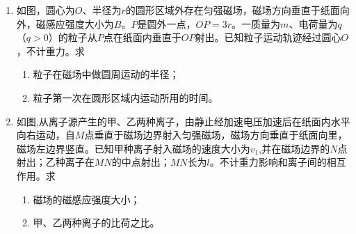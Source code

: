 \begin{enumerate}[leftmargin=0em]
\newpage
\item
{}
如图，圆心为$ O $、半径为$ r $的圆形区域外存在匀强磁场，磁场方向垂直于纸面向外，磁感应强度大小为$ B $。$ P $是圆外一点，$ OP=3r $。一质量为$ m $、电荷量为$ q $（$ q>0 $）的粒子从$ P $点在纸面内垂直于$ OP $射出。已知粒子运动轨迹经过圆心$ O $，不计重力。求
\begin{enumerate}
\renewcommand{\labelenumi}{\arabic{enumi}.}
\item
粒子在磁场中做圆周运动的半径；
\item 
粒子第一次在圆形区域内运动所用的时间。



\end{enumerate}
\begin{figure}[h!]
\flushright

\end{figure}






\newpage
\item
{}
如图,从离子源产生的甲、乙两种离子，由静止经加速电压加速后在纸面内水平向右运动，自$ M $点垂直于磁场边界射入匀强磁场，磁场方向垂直于纸面向里，磁场左边界竖直。已知甲种离子射入磁场的速度大小为$ v_{1} $,并在磁场边界的$ N $点射出；乙种离子在$ MN $的中点射出；$ MN $长为$ l $。不计重力影响和离子间的相互作用。求
\begin{enumerate}
\renewcommand{\labelenumi}{\arabic{enumi}.}
\item
磁场的磁感应强度大小；
\item 
甲、乙两种离子的比荷之比。




\end{enumerate}
\end{enumerate}
